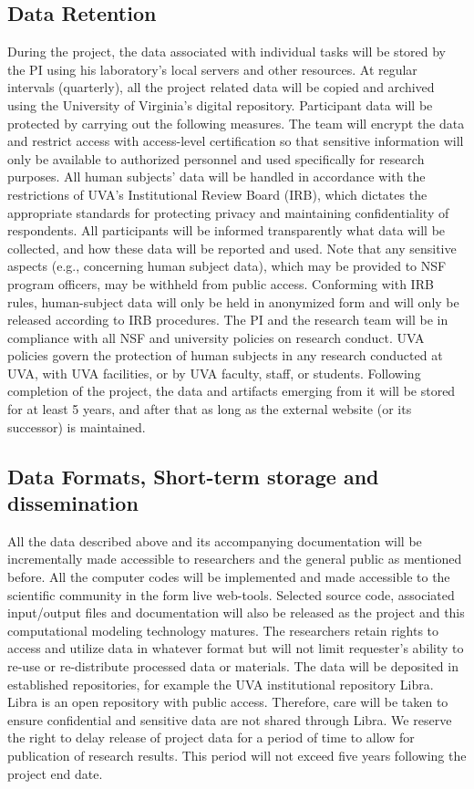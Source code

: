 \subsection*{Data Retention}
During the project, the data associated with individual tasks will be stored by the PI using his laboratory's local servers and other resources. At regular intervals (quarterly), all the project related data will be copied and archived using the University of Virginia's digital repository. Participant data will be protected by carrying out the following measures. The team will encrypt the data and restrict access with access-level certification so that sensitive information will only be available to authorized personnel and used specifically for research purposes. All human subjects’ data will be handled in accordance with the restrictions of UVA’s Institutional Review Board (IRB), which dictates the appropriate standards for protecting privacy and maintaining confidentiality of respondents. All participants will be informed transparently what data will be collected, and how these data will be reported and used. Note that any sensitive aspects (e.g., concerning human subject data), which may be provided to NSF program officers, may be withheld from public access. Conforming with IRB rules, human-subject data will only be held in anonymized form and will only be released according to IRB procedures. The PI and the research team will be in compliance with all NSF and university policies on research conduct. UVA policies govern the protection of human subjects in any research conducted at UVA, with UVA facilities, or by UVA faculty, staff, or students. Following completion of the project, the data and artifacts emerging from it will be stored for at least 5 years, and after that as long as the external website (or its successor) is maintained. 

\subsection*{Data Formats, Short-term storage and dissemination}
All the data described above and its accompanying documentation will be incrementally made accessible to researchers and the general public as mentioned before.  All the computer codes will be implemented and made accessible to the scientific community in the form live web-tools. Selected source code, associated input/output files and documentation will also be released as the project and this computational modeling technology matures. The researchers retain rights to access and utilize data in whatever format but will not limit requester’s ability to re-use or re-distribute processed data or materials. The data will be deposited in established repositories, for example the UVA institutional repository Libra. Libra is an open repository with public access. Therefore, care will be taken to ensure confidential and sensitive data are not shared through Libra. We reserve the right to delay release of project data for a period of time to allow for publication of research results. This period will not exceed five years following the project end date.

